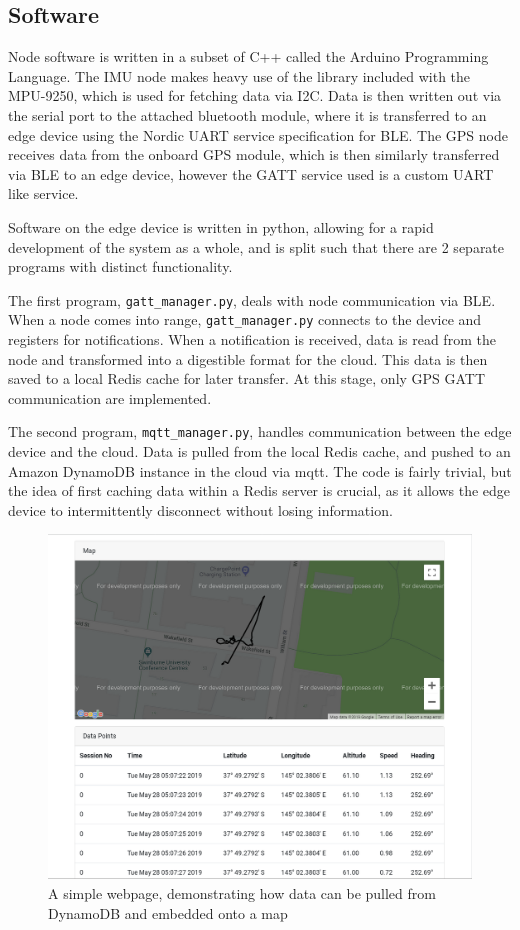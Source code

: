 \documentclass[DIV=current]{scrartcl}
\begin{document}
	\subsection{Software}
	Node software is written in a subset of C++ called the Arduino Programming Language. The IMU node makes heavy use of the library included with the MPU-9250, which is used for fetching data via I2C. Data is then written out via the serial port to the attached bluetooth module, where it is transferred to an edge device using the Nordic UART service specification for BLE. The GPS node receives data from the onboard GPS module, which is then similarly transferred via BLE to an edge device, however the GATT service used is a custom UART like service.
	
	Software on the edge device is written in python, allowing for a rapid development of the system as a whole, and is split such that there are 2 separate programs with distinct functionality.
	
	The first program, \texttt{gatt_manager.py}, deals with node communication via BLE. When a node comes into range, \texttt{gatt_manager.py} connects to the device and registers for notifications. When a notification is received, data is read from the node and transformed into a digestible format for the cloud. This data is then saved to a local Redis cache for later transfer. At this stage, only GPS GATT communication are implemented.
	
	The second program, \texttt{mqtt_manager.py}, handles communication between the edge device and the cloud. Data is pulled from the local Redis cache, and pushed to an Amazon DynamoDB instance in the cloud via mqtt. The code is fairly trivial, but the idea of first caching data within a Redis server is crucial, as it allows the edge device to intermittently disconnect without losing information.
	
	\begin{figure}[h]
		\centering
		\includegraphics[width=\linewidth]{images/webpage.png}
		\caption{A simple webpage, demonstrating how data can be pulled from DynamoDB and embedded onto a map}
		\label{fig:website}
	\end{figure}
	
\end{document}
